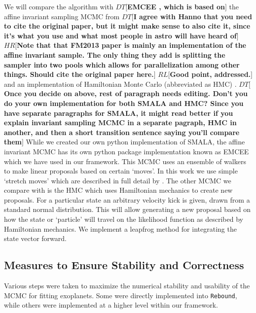 \documentclass{aa}
\def\memohr#1{\color{blue}$HR[${\bf #1}$]$ \color{black}}
\def\memodt#1{\color{green}$DT[${\bf #1}$]$ \color{black}}
\def\memorl#1{\color{gray}$RL[${\bf #1}$]$ \color{black}}
\begin{document}
We will compare the algorithm with \memodt{EMCEE \citep{Foreman-Mackey2013}, which is based on} the affine invariant sampling MCMC from \cite{Goodman2010} \memodt{I agree with Hanno that you need to cite the original paper, but it might make sense to also cite it, since it's what you use and what most people in astro will have heard of}\memohr{Note that that FM2013 paper is mainly an implementation of the affine invariant sample. The only thing they add is splitting the sampler into two pools which allows for parallelization among other things. Should cite the original paper here.} \memorl{Good point, addressed.} and an implementation of Hamiltonian Monte Carlo (abbreviated as HMC) \citep{Duane1987}.
\memodt{Once you decide on above, rest of paragraph needs editing. Don't you do your own implementation for both SMALA and HMC? Since you have separate paragraphs for SMALA, it might read better if you explain invariant sampling MCMC in a separate pagraph, HMC in another, and then a short transition sentence saying you'll compare them}
While we created our own python implementation of SMALA, the affine invariant MCMC has its own python package implementation known as EMCEE which we have used in our framework. 
This MCMC uses an ensemble of walkers to make linear proposals based on certain `moves'. 
In this work we use simple `stretch moves' which are described in full detail by \cite{Foreman-Mackey2013}. 
The other MCMC we compare with is the HMC which uses Hamiltonian mechanics to create new proposals. 
For a particular state an arbitrary velocity kick is given, drawn from a standard normal distribution. 
This will allow generating a new proposal based on how the state or `particle' will travel on the likelihood function as described by Hamiltonian mechanics. We implement a leapfrog method for integrating the state vector forward.

\subsection{Measures to Ensure Stability and Correctness}
Various steps were taken to maximize the numerical stability and usability of the MCMC for fitting exoplanets. Some were directly implemented into \texttt{Rebound}, while others were implemented at a higher level within our framework.
\end{document}
